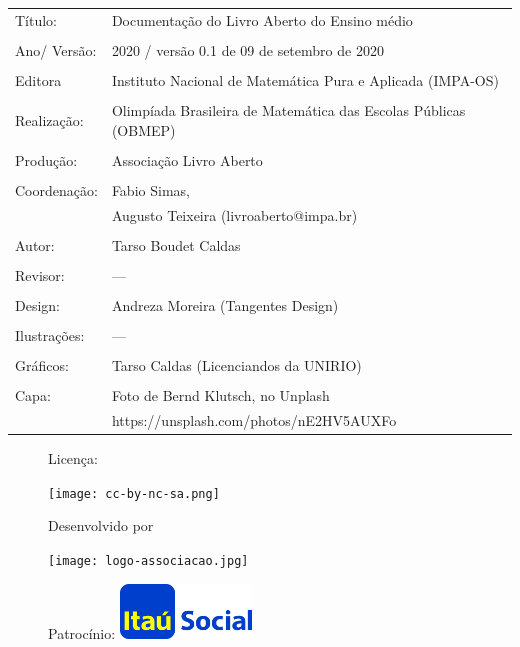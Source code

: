 \begin{tabular}{p{}p{}}
Título: & Documentação do Livro Aberto do Ensino médio\\
\\
Ano/ Versão: & 2020 / versão 0.1 de 09 de setembro de 2020\\
\\
Editora & Instituto Nacional de Matem\'atica Pura e Aplicada (IMPA-OS)\\
\\
Realização:& Olimp\'iada Brasileira de Matem\'atica das Escolas P\'ublicas (OBMEP)\\
\\
Produção:& Associação Livro Aberto\\
\\
Coordenação:& Fabio Simas, \\
			& Augusto Teixeira (livroaberto@impa.br)\\
\\
  Autor: & Tarso Boudet Caldas\\
        
           
\\
Revisor: &  --- \\
            
\\
Design: & Andreza Moreira (Tangentes Design) \\
\\
  Ilustrações: & --- \\ 
\\
Gráficos: & Tarso Caldas (Licenciandos da UNIRIO)\\
\\
  Capa: & Foto de Bernd Klutsch, no Unplash \\
  		& https://unsplash.com/photos/nE2HV5AUXFo
\end{tabular}
\vspace{.5cm}


\begin{figure}[b]
\begin{minipage}[l]{5cm}
\centering

{\large Licença:}

  \texttt{[image: cc-by-nc-sa.png]}
\end{minipage}\hfill
\begin{minipage}[c]{5cm}
\centering
{\large Desenvolvido por}

\texttt{[image: logo-associacao.jpg]}
\end{minipage}
\begin{minipage}[r]{5cm}
\centering

{\large Patrocínio:}
  \vspace{1em}
  \includegraphics[width=3.5cm]{itau}
\end{minipage}
\end{figure}

